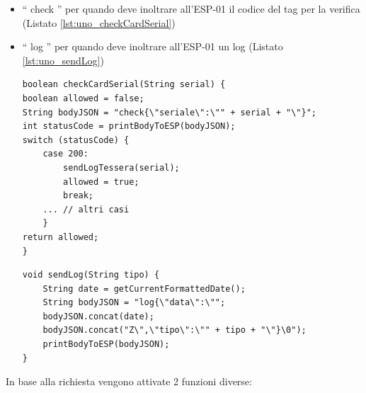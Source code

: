 \documentclass[12pt]{report}
\begin{document}
\begin{itemize}
	\item \textquotedblleft{} check \textquotedblright{} per quando deve inoltrare all'ESP-01 il codice del tag per la verifica (Listato \ref{lst:uno_checkCardSerial})
	\item \textquotedblleft{} log \textquotedblright{} per quando deve inoltrare all'ESP-01 un log (Listato \ref{lst:uno_sendLog})
	
\begin{lstlisting}[caption={L'Arduino manda all'ESP-01 il seriale della tessera in formato JSON e aspetta la risposta con lo status code. Se statusCode = 200 allora mette la variabile allowed a \textquotedblleft{} true \textquotedblright{}. La funzione printBodyToESP si può vedere nel Listato \ref{lst:uno_printBodyToESP} }, label={lst:uno_checkCardSerial}, xleftmargin=\dimexpr-\leftmargini]
boolean checkCardSerial(String serial) {
boolean allowed = false;
String bodyJSON = "check{\"seriale\":\"" + serial + "\"}";
int statusCode = printBodyToESP(bodyJSON);
switch (statusCode) {
	case 200:
		sendLogTessera(serial);
		allowed = true;
		break;
	... // altri casi
	}
return allowed;
}
\end{lstlisting}

\pagebreak
	
\begin{lstlisting}[caption={L'Arduino manda all'ESP-01 il log in formato JSON e aspetta la risposta con lo status code. Se statusCode = 200 allora scrive un messagio di successo, altrimenti stampa un messaggio d'errore. La funzione printBodyToESP si può vedere nel Listato \ref{lst:uno_printBodyToESP}.}, label={lst:uno_sendLog}, xleftmargin=\dimexpr-\leftmargini]
void sendLog(String tipo) {
	String date = getCurrentFormattedDate();
	String bodyJSON = "log{\"data\":\"";
	bodyJSON.concat(date);
	bodyJSON.concat("Z\",\"tipo\":\"" + tipo + "\"}\0");
	printBodyToESP(bodyJSON);
}
\end{lstlisting}

\end{itemize}
In base alla richiesta vengono attivate 2 funzioni diverse:
\end{document}
